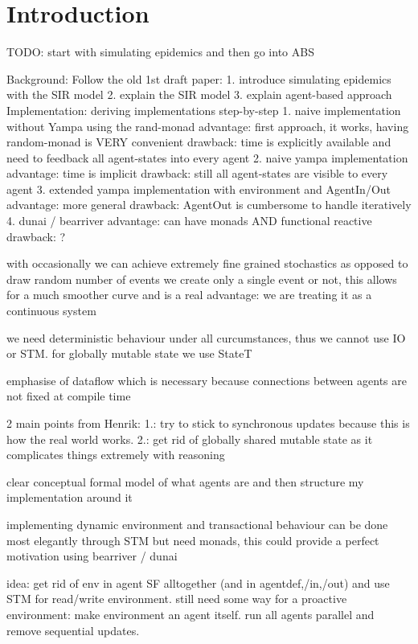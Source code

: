 \section{Introduction}
TODO: start with simulating epidemics and then go into ABS

Background: Follow the old 1st draft paper:
1. introduce simulating epidemics with the SIR model
2. explain the SIR model 
3. explain agent-based approach 
Implementation: deriving implementations step-by-step 
1. naive implementation without Yampa using the rand-monad 
	advantage: 	first approach, it works, having random-monad is VERY convenient
	drawback: 	time is explicitly available and need to feedback all agent-states into every agent
2. naive yampa implementation
	advantage:	time is implicit
	drawback:	still all agent-states are visible to every agent
3. extended yampa implementation with environment and AgentIn/Out
	advantage:	more general
	drawback:	AgentOut is cumbersome to handle iteratively
4. dunai / bearriver
	advantage:	can have monads AND functional reactive 
	drawback:	?
	
with occasionally we can achieve extremely fine grained stochastics as opposed to draw random number of events we create only a single event or not, this allows for a much smoother curve and is a real advantage: we are treating it as a continuous system

we need deterministic behaviour under all curcumstances, thus we cannot use IO or STM. for globally mutable state we use StateT

emphasise of dataflow which is necessary because connections between agents are not fixed at compile time

2 main points from Henrik: 1.: try to stick to synchronous updates because this is how the real world works. 2.: get rid of globally shared mutable state as it complicates things extremely with reasoning

clear conceptual formal model of what agents are and then structure my implementation around it

implementing dynamic environment and transactional behaviour can be done most elegantly through STM but need monads, this could provide a perfect motivation using bearriver / dunai 

idea: get rid of env in agent SF alltogether (and in agentdef,/in,/out) and use STM for read/write environment. still need some way for a proactive environment: make environment an agent itself. run all agents parallel and remove sequential updates.